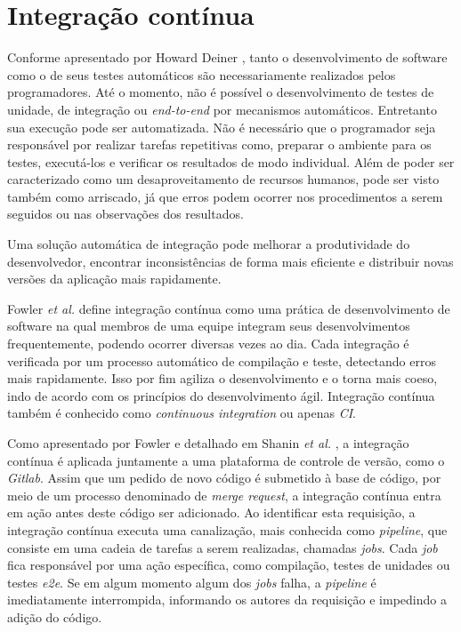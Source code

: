 \hypertarget{integracao-continua}{%
\section{Integração contínua}\label{integracao-continua}}

Conforme apresentado por Howard Deiner \cite{deiner}, tanto o desenvolvimento de software como o de seus testes automáticos são necessariamente realizados pelos programadores. Até o momento, não é possível o desenvolvimento de testes de unidade, de integração ou \emph{end-to-end} por mecanismos automáticos. Entretanto sua execução pode ser automatizada. Não é necessário que o programador seja responsável por realizar tarefas repetitivas como, preparar o ambiente para os testes, executá-los e verificar os resultados de modo individual. Além de poder ser caracterizado como um desaproveitamento de recursos humanos, pode ser visto também como arriscado, já que erros podem ocorrer nos procedimentos a serem seguidos ou nas observações dos resultados.

Uma solução automática de integração pode melhorar a produtividade do desenvolvedor, encontrar inconsistências de forma mais eficiente e distribuir novas versões da aplicação mais rapidamente.

Fowler \emph{et al.} \cite{fowler} define integração contínua como uma prática de desenvolvimento de software na qual membros de uma equipe integram seus desenvolvimentos frequentemente, podendo ocorrer diversas vezes ao dia. Cada integração é verificada por um processo automático de compilação e teste, detectando erros mais rapidamente. Isso por fim agiliza o desenvolvimento e o torna mais coeso, indo de acordo com os princípios do desenvolvimento ágil. Integração contínua também é conhecido como \emph{continuous integration} ou apenas \emph{CI}.

Como apresentado por Fowler e detalhado em Shanin \emph{et al.} \cite{shahin}, a integração contínua é aplicada juntamente a uma plataforma de controle de versão, como o \emph{Gitlab}. Assim que um pedido de novo código é submetido à base de código, por meio de um processo denominado de \emph{merge request}, a integração contínua entra em ação antes deste código ser adicionado. Ao identificar esta requisição, a integração contínua executa uma canalização, mais conhecida como \emph{pipeline}, que consiste em uma cadeia de tarefas a serem realizadas, chamadas \emph{jobs}. Cada \emph{job} fica responsável por uma ação específica, como compilação, testes de unidades ou testes \emph{e2e}. Se em algum momento algum dos \emph{jobs} falha, a \emph{pipeline} é imediatamente interrompida, informando os autores da requisição e impedindo a adição do código.

